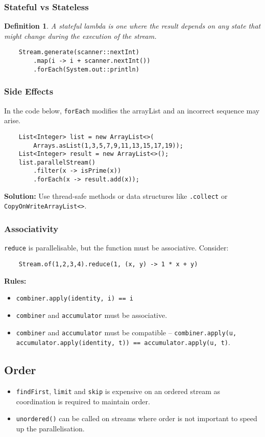 \documentclass[10pt,landscape,a4paper]{article}
\newtheorem{definition}{Definition}[section]
\begin{document}
\begin{multicols*}{4}
\subsubsection{Stateful vs Stateless}
\begin{definition}
    A stateful lambda is one where the result depends on any state that might change during the execution of the stream.
\end{definition}

\begin{lstlisting}
    Stream.generate(scanner::nextInt)
        .map(i -> i + scanner.nextInt())
        .forEach(System.out::println)
\end{lstlisting}


\subsubsection{Side Effects}
In the code below, \texttt{forEach} modifies the arrayList and an incorrect sequence may arise.
\begin{lstlisting}
    List<Integer> list = new ArrayList<>(
        Arrays.asList(1,3,5,7,9,11,13,15,17,19));
    List<Integer> result = new ArrayList<>();
    list.parallelStream()
        .filter(x -> isPrime(x))
        .forEach(x -> result.add(x));
\end{lstlisting}
\textbf{Solution:} Use thread-safe methods or data structures like \texttt{.collect} or \texttt{CopyOnWriteArrayList<>}.
\subsubsection{Associativity}
\texttt{reduce} is parallelisable, but the function must be associative. Consider:
\begin{lstlisting}
    Stream.of(1,2,3,4).reduce(1, (x, y) -> 1 * x + y)
\end{lstlisting}
\textbf{Rules:}
\begin{itemize}
    \item \texttt{combiner.apply(identity, i) == i}
    \item \texttt{combiner} and \texttt{accumulator} must be associative.
    \item \texttt{combiner} and \texttt{accumulator} must be compatible -- \texttt{combiner.apply(u, accumulator.apply(identity, t)) == accumulator.apply(u, t)}.
\end{itemize}

\subsection{Order}
\begin{itemize}
    \item \texttt{findFirst}, \texttt{limit} and \texttt{skip} is expensive on an ordered stream as coordination is required to maintain order. \\
    \item \texttt{unordered()} can be called on streams where order is not important to speed up the parallelisation.
\end{itemize}


\end{multicols*}
\end{document}
